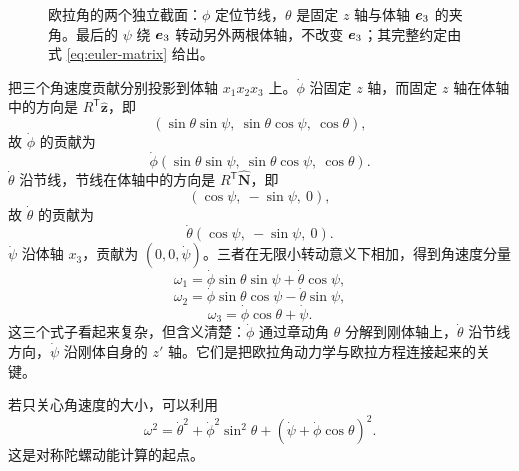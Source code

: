 \begin{figure}[htbp]
\centering
{}
\caption{欧拉角的两个独立截面：$\phi$ 定位节线，$\theta$ 是固定 $z$ 轴与体轴 $\boldsymbol{e}_3$ 的夹角。最后的 $\psi$ 绕 $\boldsymbol{e}_3$ 转动另外两根体轴，不改变 $\boldsymbol{e}_3$；其完整约定由式 \eqref{eq:euler-matrix} 给出。}
\label{fig:euler-angles}
\end{figure}

把三个角速度贡献分别投影到体轴 \(x_1x_2x_3\) 上。\(\dot\phi\) 沿固定 \(z\) 轴，而固定 \(z\) 轴在体轴中的方向是 \(R^{\mathsf T}\hat{\boldsymbol z}\)，即
\[
(\sin\theta\sin\psi,\ \sin\theta\cos\psi,\ \cos\theta),
\]
故 \(\dot\phi\) 的贡献为
\[
\dot\phi(\sin\theta\sin\psi,\ \sin\theta\cos\psi,\ \cos\theta).
\]
\(\dot\theta\) 沿节线，节线在体轴中的方向是 \(R^{\mathsf T}\hat{\boldsymbol N}\)，即
\[
(\cos\psi,\ -\sin\psi,\ 0),
\]
故 \(\dot\theta\) 的贡献为
\[
\dot\theta(\cos\psi,\ -\sin\psi,\ 0).
\]
\(\dot\psi\) 沿体轴 \(x_3\)，贡献为 \((0,0,\dot\psi)\)。三者在无限小转动意义下相加，得到角速度分量
\begin{equation}
\omega_1=\dot\phi\sin\theta\sin\psi+\dot\theta\cos\psi,
\label{eq:euler-omega1}
\end{equation}
\begin{equation}
\omega_2=\dot\phi\sin\theta\cos\psi-\dot\theta\sin\psi,
\label{eq:euler-omega2}
\end{equation}
\begin{equation}
\omega_3=\dot\phi\cos\theta+\dot\psi.
\label{eq:euler-omega3}
\end{equation}
这三个式子看起来复杂，但含义清楚：\(\dot\phi\) 通过章动角 \(\theta\) 分解到刚体轴上，\(\dot\theta\) 沿节线方向，\(\dot\psi\) 沿刚体自身的 \(z'\) 轴。它们是把欧拉角动力学与欧拉方程连接起来的关键。

\begin{mathbox}
若只关心角速度的大小，可以利用
\[
\omega^2=\dot\theta^2+\dot\phi^2\sin^2\theta
+(\dot\psi+\dot\phi\cos\theta)^2.
\]
这是对称陀螺动能计算的起点。
\end{mathbox}

